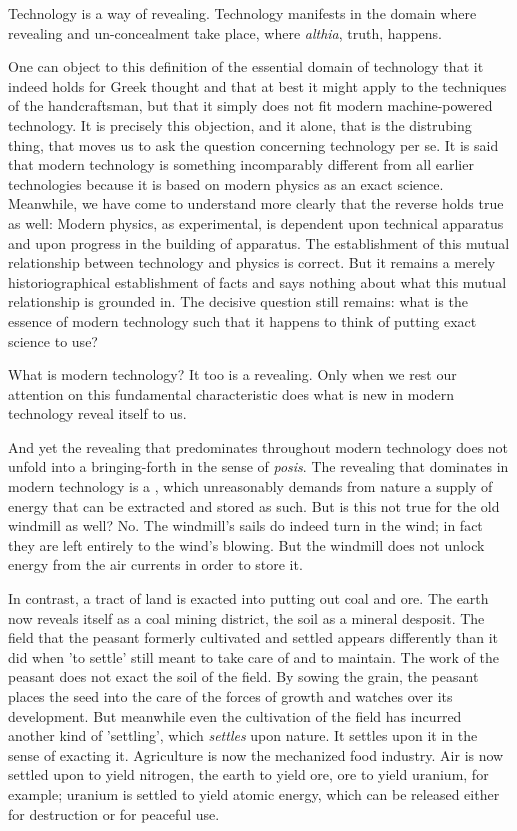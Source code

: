 Technology is a way of revealing. Technology manifests in the domain where revealing and un-concealment take place, where \textit{althia}, truth, happens.

One can object to this definition of the essential domain of technology that it indeed holds for Greek thought and that at best it might apply to the techniques of the handcraftsman, but that it simply does not fit modern machine-powered technology. It is precisely this objection, and it alone, that is the distrubing thing, that moves us to ask the question concerning technology per se. It is said that modern technology is something incomparably different from all earlier technologies because it is based on modern physics as an exact science. Meanwhile, we have come to understand more clearly that the reverse holds true as well: Modern physics, as experimental, is dependent upon technical apparatus and upon progress in the building of apparatus. The establishment of this mutual relationship between technology and physics is correct. But it remains a merely historiographical establishment of facts and says nothing about what this mutual relationship is grounded in. The decisive question still remains: what is the essence of modern technology such that it happens to think of putting exact science to use?

What is modern technology? It too is a revealing. Only when we rest our attention on this fundamental characteristic does what is new in modern technology reveal itself to us. 

And yet the revealing that predominates throughout modern technology does not unfold into a bringing-forth in the sense of \textit{posis}. The revealing that dominates in modern technology is a , which unreasonably demands from nature a supply of energy that can be extracted and stored as such. But is this not true for the old windmill as well? No. The windmill's sails do indeed turn in the wind; in fact they are left entirely to the wind's blowing. But the windmill does not unlock energy from the air currents in order to store it.

In contrast, a tract of land is exacted into putting out coal and ore. The earth now reveals itself as a coal mining district, the soil as a mineral desposit. The field that the peasant formerly cultivated and settled appears differently than it did when 'to settle' still meant to take care of and to maintain. The work of the peasant does not exact the soil of the field. By sowing the grain, the peasant places the seed into the care of the forces of growth and watches over its development. But meanwhile even the cultivation of the field has incurred another kind of 'settling', which \textit{settles} upon nature. It settles upon it in the sense of exacting it. Agriculture is now the mechanized food industry. Air is now settled upon to yield nitrogen, the earth to yield ore, ore to yield uranium, for example; uranium is settled to yield atomic energy, which can be released either for destruction or for peaceful use.

